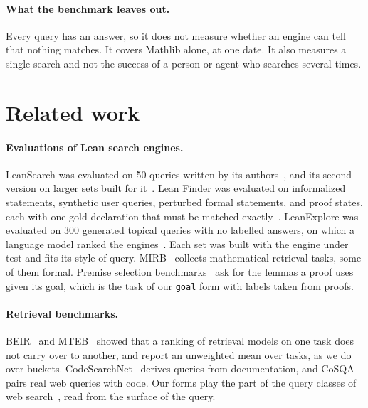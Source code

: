 \documentclass{article}
\newcommand{\code}[1]{\texttt{\small #1}}
\begin{document}
\paragraph{What the benchmark leaves out.} Every query has an answer, so it
does not measure whether an engine can tell that nothing matches. It covers
Mathlib alone, at one date. It also measures a single search and not the
success of a person or agent who searches several times.

\section{Related work}

\paragraph{Evaluations of Lean search engines.} LeanSearch was evaluated on
50 queries written by its authors~\cite{gao2024leansearch}, and its second
version on larger sets built for it~\cite{gao2026leansearchv2}. Lean Finder
was evaluated on informalized statements, synthetic user queries, perturbed
formal statements, and proof states, each with one gold declaration that must
be matched exactly~\cite{lu2025leanfinder}. LeanExplore was evaluated on 300
generated topical queries with no labelled answers, on which a language model
ranked the engines~\cite{asher2025leanexplore}. Each set was built with the
engine under test and fits its style of query. MIRB~\cite{ju2025mirb} collects
mathematical retrieval tasks, some of them formal. Premise selection
benchmarks~\cite{yang2023leandojo,tao2025premise} ask for the lemmas a proof
uses given its goal, which is the task of our \code{goal} form with labels
taken from proofs.

\paragraph{Retrieval benchmarks.} BEIR~\cite{thakur2021beir} and
MTEB~\cite{muennighoff2023mteb} showed that a ranking of retrieval models on
one task does not carry over to another, and report an unweighted mean over
tasks, as we do over buckets. CodeSearchNet~\cite{husain2019codesearchnet}
derives queries from documentation, and CoSQA~\cite{huang2021cosqa} pairs
real web queries with code. Our forms play the part of the query classes of
web search~\cite{broder2002taxonomy}, read from the surface of the query.
\end{document}
